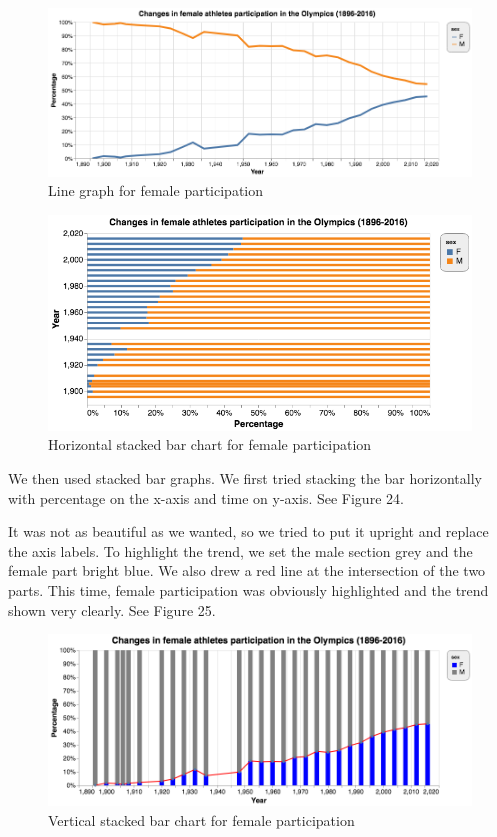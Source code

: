 \documentclass[12pt]{article}
\begin{document}
\begin{figure}[!b]
    \centering
    \includegraphics[scale=0.5]{pics/g-1-1.png}
    \caption{Line graph for female participation}
    \label{fig:my_label}
\end{figure}

\begin{figure}[!t]
    \centering
    \includegraphics[scale=0.6]{pics/g-1-2.png}
    \caption{Horizontal stacked bar chart for female participation}
    \label{fig:my_label}
\end{figure}
We then used stacked bar graphs. We first tried stacking the bar horizontally with percentage on the x-axis and time on y-axis. See Figure 24.

It was not as beautiful as we wanted, so we tried to put it upright and replace the axis labels. To highlight the trend, we set the male section grey and the female part bright blue. We also drew a red line at the intersection of the two parts. This time, female participation was obviously highlighted and the trend shown very clearly. See Figure 25.

\begin{figure}[!b]
    \centering
    \includegraphics[scale=0.48]{pics/g-1-3.png}
    \caption{Vertical stacked bar chart for female participation}
    \label{fig:my_label}
\end{figure}
\end{document}
